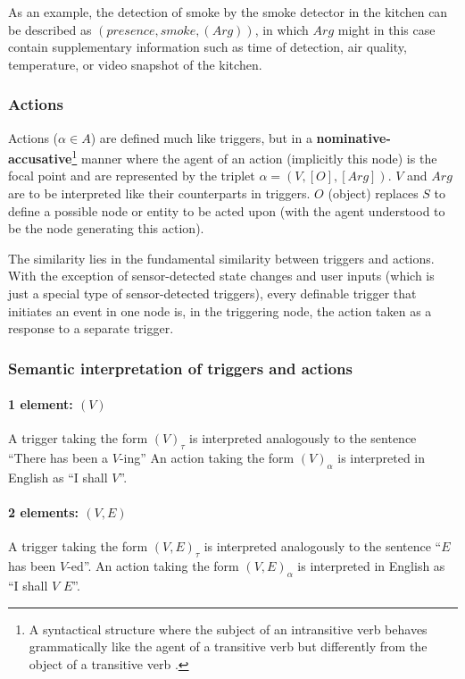 \documentclass[letterpaper, twocolumn, 10pt, conference]{IEEEtran}
\newcommand{\term}[1]{\textbf{#1}}
\begin{document}
As an example, the detection of smoke by the smoke detector in the kitchen can be described as $ (presence, smoke, (Arg)) $, in which $ Arg $ might in this case contain supplementary information such as time of detection, air quality, temperature, or video snapshot of the kitchen.

\subsubsection{Actions} \label{sssec:actions}

Actions ($ \alpha \in A $) are defined much like triggers, but in a \term{nominative-accusative}\footnote{A syntactical structure where the subject of an intransitive verb behaves grammatically like the agent of a transitive verb but differently from the object of a transitive verb \cite{comrie1989language}.} manner where the agent of an action (implicitly this node) is the focal point and are represented by the triplet $ \alpha = (V, [O], [Arg]) $. $ V $ and $ Arg $ are to be interpreted like their counterparts in triggers. $ O $ (object) replaces $ S $ to define a possible node or entity to be acted upon (with the agent understood to be the node generating this action).

The similarity lies in the fundamental similarity between triggers and actions. With the exception of sensor-detected state changes and user inputs (which is just a special type of sensor-detected triggers), every definable trigger that initiates an event in one node is, in the triggering node, the action taken as a response to a separate trigger.

\subsubsection{Semantic interpretation of triggers and actions} \label{sssec:semantic_interpretation}

\paragraph{1 element: $ (V) $}
A trigger taking the form $(V)_{\tau}$ is interpreted analogously to the sentence \enquote{There has been a $V$-ing} An action taking the form $(V)_{\alpha}$ is interpreted in English as \enquote{I shall $V$}.

\paragraph{2 elements: $ (V, E) $}
A trigger taking the form $(V, E)_{\tau}$ is interpreted analogously to the sentence \enquote{$E$ has been $V$-ed}. An action taking the form $(V, E)_{\alpha}$ is interpreted in English as \enquote{I shall $V$ $E$}.
\end{document}
